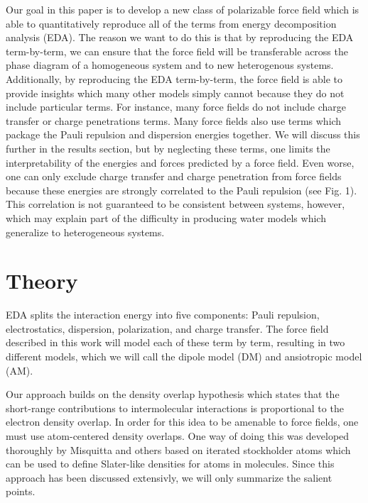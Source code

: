 \documentclass[journal=jacsat,manuscript=article]{achemso}
\begin{document}
Our goal in this paper is to develop a new class of polarizable
force field which is able to quantitatively reproduce all of the terms
from energy decomposition analysis (EDA). The reason we want to do this
is that by reproducing the EDA term-by-term, we can ensure that the force
field will be transferable across the phase diagram of a homogeneous
system and to new heterogenous systems.
Additionally, by reproducing the EDA term-by-term, the force field
is able to provide insights which many other models simply cannot because
they do not include particular terms. For instance, many force fields
do not include charge transfer or charge penetrations terms.
Many force fields also use terms which package the Pauli repulsion and dispersion 
energies together. We will discuss this further in the results section,
but by neglecting these terms, one limits the interpretability of the
energies and forces predicted by a force field. Even worse, one can only
exclude charge transfer and charge penetration from force fields because
these energies are strongly correlated to the Pauli repulsion (see Fig. 1).
This correlation is not guaranteed to be consistent between systems, however,
which may explain part of the difficulty in producing water models which
generalize to heterogeneous systems.

\section{Theory}
EDA splits the interaction energy into five components: Pauli repulsion,
electrostatics, dispersion, polarization, and charge transfer. The force
field described in this work will model each of these term by term, resulting
in two different models, which we will call the dipole model (DM) and
ansiotropic model (AM).

Our approach builds on the density overlap hypothesis\cite{kim1981dependence,wheatley1990overlap,gavezzotti2002calculation,van2016beyond}
which states that the short-range contributions to intermolecular
interactions is proportional to the electron density overlap. In order
for this idea to be amenable to force fields, one must use atom-centered
density overlaps. One way of doing this was developed thoroughly by
Misquitta and others\cite{misquitta2014distributed,misquitta2018isa} based
on iterated stockholder atoms which can be used to define Slater-like
densities for atoms in molecules. Since this approach has been discussed
extensivly, we will only summarize the salient points.
\end{document}
